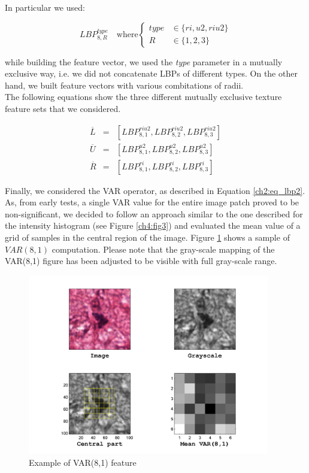In particular we used:

\begin{equation}
 LBP_{8,R}^{type} \quad \textrm{where} \begin{cases}
    type  & \in \{ri, u2, riu2\}\\
    R  & \in \{1,2,3\}
  \end{cases}
\end{equation}

while building the feature vector, we used the \textit{type} parameter in a mutually exclusive way, i.e. we did not concatenate \Glspl{LBP} of different types. On the other hand, we
built feature vectors with various combitations of radii.\\
The following equations show the three different mutually exclusive texture feature sets that we considered.

\begin{eqnarray}
\label{ch4:tftypes}
 \overline{L} & = & \left[ LBP_{8,1}^{riu2}, LBP_{8,2}^{riu2}, LBP_{8,3}^{riu2} \right] \\
 \overline{U} & = & \left[ LBP_{8,1}^{u2}, LBP_{8,2}^{u2}, LBP_{8,3}^{u2} \right] \\
 \overline{R} & = & \left[ LBP_{8,1}^{ri}, LBP_{8,2}^{ri}, LBP_{8,3}^{ri} \right]
\end{eqnarray}

Finally, we considered the \Gls{VAR} operator, as described in Equation \ref{ch2:eq_lbp2}. As, from early tests, a single \Gls{VAR} value for the entire image patch proved to be non-significant, we
decided to follow an approach similar to the one described for the intensity histogram (see Figure \ref{ch4:fig3}) and evaluated the mean value of a grid of samples in the central
region of the image. Figure \ref{ch4:fig4} shows a sample of $VAR(8,1)$ computation. Please note that the gray-scale mapping of the VAR(8,1) figure has been adjusted to be visible with full gray-scale range.

\begin{figure}[!hbt]
  \centering
    \includegraphics[width=0.94\textwidth]{./images/GS_VAR.png}
  \caption[Example of VAR(8,1) feature]{Example of VAR(8,1) feature}
  \label{ch4:fig4}
\end{figure}

